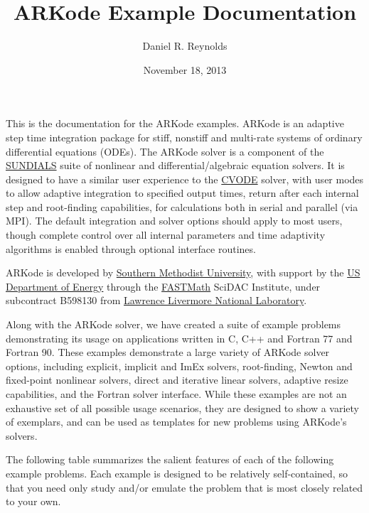\documentclass[letterpaper,10pt,english]{sphinxmanual}
\title{ARKode Example Documentation}
\date{November 18, 2013}
\author{Daniel R. Reynolds}
\begin{document}
\maketitle
\tableofcontents
{}\label{index::doc}


This is the documentation for the ARKode examples.  ARKode is an
adaptive step time integration package for stiff, nonstiff and
multi-rate systems of ordinary differential equations (ODEs).
The ARKode solver is a component of the \href{https://computation.llnl.gov/casc/sundials/main.html}{SUNDIALS} suite of
nonlinear and differential/algebraic equation solvers. It is designed
to have a similar user experience to the \href{https://computation.llnl.gov/casc/sundials/description/description.html\#descr\_cvode}{CVODE}
solver, with user modes to allow adaptive integration to specified
output times, return after each internal step and root-finding
capabilities, for calculations both in serial and parallel (via
MPI). The default integration and solver options should apply to most
users, though complete control over all internal parameters and time
adaptivity algorithms is enabled through optional interface routines.

ARKode is developed by \href{http://www.smu.edu}{Southern Methodist University}, with support by the \href{http://www.doe.gov}{US Department of Energy} through the \href{http://www.fastmath-scidac.org/}{FASTMath} SciDAC Institute, under subcontract
B598130 from \href{http://www.llnl.gov}{Lawrence Livermore National Laboratory}.

Along with the ARKode solver, we have created a suite of example
problems demonstrating its usage on applications written in C, C++ and
Fortran 77 and Fortran 90.  These examples demonstrate a large variety
of ARKode solver options, including explicit, implicit and ImEx
solvers, root-finding, Newton and fixed-point nonlinear solvers,
direct and iterative linear solvers, adaptive resize capabilities, and
the Fortran solver interface.  While these examples are not an
exhaustive set of all possible usage scenarios, they are designed to
show a variety of exemplars, and can be used as templates for new
problems using ARKode's solvers.

The following table summarizes the salient features of each of the
following example problems.  Each example is designed to be relatively
self-contained, so that you need only study and/or emulate the problem
that is most closely related to your own.
\end{document}
